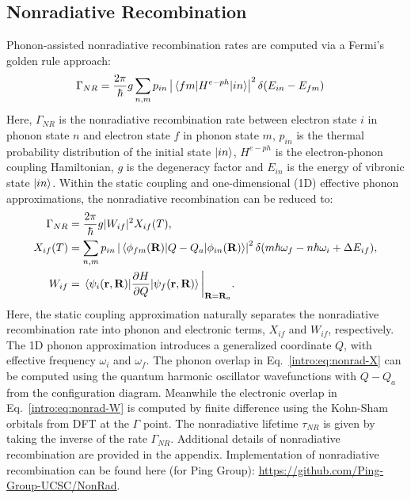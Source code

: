 \subsection{Nonradiative Recombination}
Phonon-assisted nonradiative recombination rates are computed via a Fermi's golden rule approach:
\begin{align}
    \Gamma_{NR} &= \frac{2\pi}{\hbar}g\sum_{n,m}p_{in}\left|\mel{fm}{H^{e-ph}}{in}\right|^2\delta(E_{in}-E_{fm}) \label{intro:eq:nonrad-full}
\end{align}
Here, $\Gamma_{NR}$ is the nonradiative recombination rate between electron state $i$ in phonon state $n$ and electron state $f$ in phonon state $m$, $p_{in}$ is the thermal probability distribution of the initial state $\ket{in}$, $H^{e-ph}$ is the electron-phonon coupling Hamiltonian, $g$ is the degeneracy factor and $E_{in}$ is the energy of vibronic state $\ket{in}$. Within the static coupling and one-dimensional (1D) effective phonon approximations, the nonradiative recombination can be reduced to:
\begin{align}
    \Gamma_{NR} &= \frac{2\pi}{\hbar}g|W_{if}|^2 X_{if}(T), \label{intro:eq:nonrad}\\
    X_{if}(T) &= \sum_{n,m}p_{in}\left|\mel{\phi_{fm}(\textbf{R})}{Q-Q_a}{\phi_{in}(\mathbf{R})}\right|^2 \delta(m\hbar\omega_f - n\hbar\omega_i+\Delta E_{if}), \label{intro:eq:nonrad-X} \\
    W_{if} &= \mel{\psi_i(\mathbf{r}, \textbf{R})}{\frac{\partial H}{\partial Q}}{\psi_f(\mathbf{r},\textbf{R})}\bigg{|}_{\textbf{R}=\textbf{R}_a}. \label{intro:eq:nonrad-W}
\end{align}
Here, the static coupling approximation naturally separates the nonradiative recombination rate into phonon and electronic terms, $X_{if}$ and $W_{if}$, respectively. The 1D phonon approximation introduces a generalized coordinate $Q$, with effective frequency $\omega_i$ and $\omega_f$. The phonon overlap in Eq.~\ref{intro:eq:nonrad-X} can be computed using the quantum harmonic oscillator wavefunctions with $Q-Q_a$ from the configuration diagram. Meanwhile the electronic overlap in Eq.~\ref{intro:eq:nonrad-W} is computed by finite difference using the Kohn-Sham orbitals from DFT at the $\Gamma$ point. The nonradiative lifetime $\tau_{NR}$ is given by taking the inverse of the rate $\Gamma_{NR}$. Additional details of nonradiative recombination are provided in the appendix. Implementation of nonradiative recombination can be found here (for Ping Group): \url{https://github.com/Ping-Group-UCSC/NonRad}.


